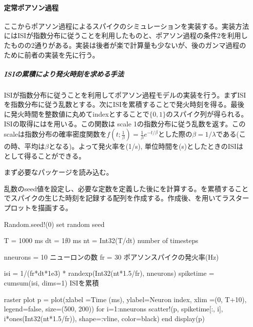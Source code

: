 \documentclass[letterpaper,10pt,english]{sphinxmanual}
\begin{document}
\paragraph{定常ポアソン過程}
\label{\detokenize{2-8_isi:id3}}
ここからポアソン過程によるスパイクのシミュレーションを実装する。実装方法にはISIが指数分布に従うことを利用したものと、ポアソン過程の条件2を利用したものの2通りがある。実装は後者が楽で計算量も少ないが、後のガンマ過程のために前者の実装を先に行う。


\subparagraph{ISIの累積により発火時刻を求める手法}
\label{\detokenize{2-8_isi:isi}}
ISIが指数分布に従うことを利用してポアソン過程モデルの実装を行う。まずISIを指数分布に従う乱数とする。次にISIを累積することで発火時刻を得る。最後に発火時間を整数値に丸めてindexとすることで\(\{0, 1\}\)のスパイク列が得られる。ISIの取得にはを用いる。この関数は scale 1の指数分布に従う乱数を返す。このscaleは指数分布の確率密度関数を\(f(t; \frac{1}{\beta}) = \frac{1}{\beta} e^{-t/\beta}\)とした際の\(\beta = 1/\lambda\)である(この時、平均は\(\beta\)となる)。よって発火率を(1/s), 単位時間を(s)としたときのISIは として得ることができる。

まず必要なパッケージを読み込む。

\begin{sphinxVerbatim}[commandchars=\\\{\}]
 
 
\end{sphinxVerbatim}

乱数のseed値を設定し、必要な定数を定義した後にを計算する。を累積することでスパイクの生じた時刻を記録する配列を作成する。作成後、を用いてラスタープロットを描画する。

\begin{sphinxVerbatim}[commandchars=\\\{\}]
Random.seed!(0) \PYGZsh{} set random seed

T = 1000 \PYGZsh{} ms
dt = 1f0 \PYGZsh{} ms
nt = Int32(T/dt) \PYGZsh{} number of timesteps

n\PYGZus{}neurons = 10 \PYGZsh{} ニューロンの数
fr = 30 \PYGZsh{} ポアソンスパイクの発火率(Hz)

isi = 1/(fr*dt*1e\PYGZhy{}3) * randexp(Int32(nt*1.5/fr), n\PYGZus{}neurons)
spike\PYGZus{}time = cumsum(isi, dims=1) \PYGZsh{} ISIを累積

\PYGZsh{} raster plot
p = plot(xlabel =\PYGZdq{}Time (ms)\PYGZdq{}, ylabel=\PYGZdq{}Neuron index\PYGZdq{}, xlim =(0, T+10), legend=false, size=(500, 200))
for i=1:n\PYGZus{}neurons
    scatter!(p, spike\PYGZus{}time[:, i], i*ones(Int32(nt*1.5/fr)), shape=:vline, color=\PYGZdq{}black\PYGZdq{})
end
display(p)
\end{sphinxVerbatim}
\end{document}
